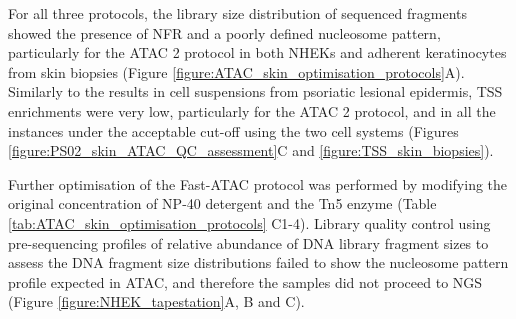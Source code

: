 For all three protocols, the library size distribution of sequenced fragments showed the presence of NFR and a poorly defined nucleosome pattern, particularly for the ATAC 2 protocol in both NHEKs and adherent keratinocytes from skin biopsies (Figure \ref{figure:ATAC_skin_optimisation_protocols}A). Similarly to the results in cell suspensions from psoriatic lesional epidermis, TSS enrichments were very low, particularly for the ATAC 2 protocol, and in all the instances under the acceptable cut-off using the two cell systems (Figures \ref{figure:PS02_skin_ATAC_QC_assessment}C and \ref{figure:TSS_skin_biopsies}).

Further optimisation of the Fast-ATAC protocol was performed by modifying the original concentration of NP-40 detergent and the Tn5 enzyme (Table \ref{tab:ATAC_skin_optimisation_protocols} C1-4). Library quality control using pre-sequencing profiles of relative abundance of DNA library fragment sizes to assess the DNA fragment size distributions failed to show the nucleosome pattern profile expected in ATAC, and therefore the samples did not proceed to NGS (Figure \ref{figure:NHEK_tapestation}A, B and C).

 

